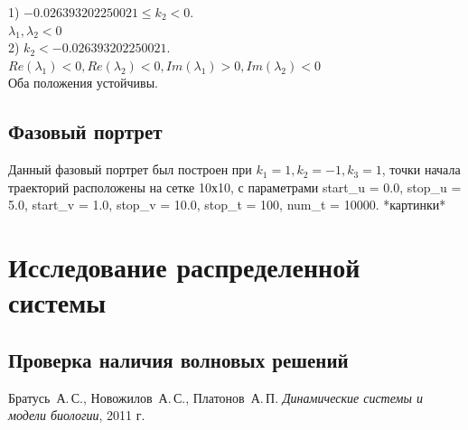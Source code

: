 \documentclass[oneside, final, 12pt]{article}
\begin{document}
1) \( -0.026393202250021 \leq k_2 < 0\).\\

\(
\lambda_1, \lambda_2 < 0
\)\\

2) \(k_2 < -0.026393202250021 \).\\

\( Re(\lambda_1)<0, Re(\lambda_2)<0, Im(\lambda_1)>0, Im(\lambda_2)<0 \)\\

Оба положения устойчивы.\\

\subsection{Фазовый портрет}

Данный фазовый портрет был построен при \(k_1 = 1,k_2 = -1,k_3 = 1\), точки начала траекторий расположены на сетке 10х10, с параметрами start_u = 0.0, stop_u = 5.0, start_v = 1.0, stop_v = 10.0, stop_t = 100, num_t = 10000.
*картинки*

\newpage
\section{Исследование распределенной системы}
\subsection{Проверка наличия волновых решений}




\newpage
\clearpage
\begin{thebibliography}{0}
	Братусь~А.\,С., Новожилов~А.\,С., Платонов~А.\,П. \label{Bratus_book}
	\emph{Динамические системы и модели биологии},
	2011 г.
\end{thebibliography}
\end{document}
